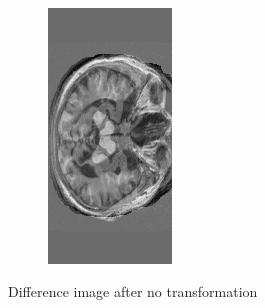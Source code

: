 \documentclass[11pt,a4paper,oneside]{report}
\begin{document}
\begin{figure}[H]
\begin{subfigure}[b]{0.3\textwidth}
        \end{subfigure}
        ~~~~ %
        \begin{subfigure}[b]{0.3\textwidth}
                \includegraphics[width=\textwidth, height=\textwidth, trim=0 20 0 20, clip=true, angle=90 ]{figures/diff/t1Init_z.jpg}
        \end{subfigure}
        \caption{Difference image after no transformation}\label{fig:init}
\end{figure}
\end{document}
